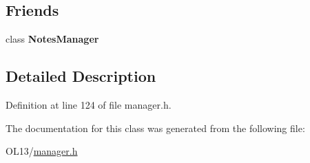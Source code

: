 \subsection*{Friends}
\begin{DoxyCompactItemize}
\item 
\mbox{\label{class_notes_manager_1_1_iterator_a017a5144e8cfa6087305055ab968ef41}} 
class {\bfseries Notes\+Manager}
\end{DoxyCompactItemize}


\subsection{Detailed Description}


Definition at line 124 of file manager.\+h.



The documentation for this class was generated from the following file\+:\begin{DoxyCompactItemize}
\item 
O\+L13/\hyperlink{manager_8h}{manager.\+h}\end{DoxyCompactItemize}
